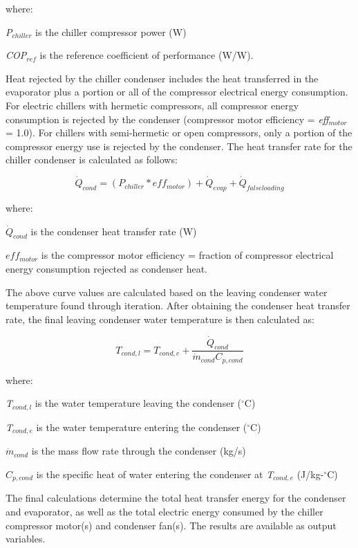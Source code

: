 where:

\emph{P\(_{chiller}\)} is the chiller compressor power (W)

\emph{COP\(_{ref}\)} is the reference coefficient of performance (W/W).

Heat rejected by the chiller condenser includes the heat transferred in the evaporator plus a portion or all of the compressor electrical energy consumption. For electric chillers with hermetic compressors, all compressor energy consumption is rejected by the condenser (compressor motor efficiency = \emph{eff\(_{motor}\)} = 1.0). For chillers with semi-hermetic or open compressors, only a portion of the compressor energy use is rejected by the condenser. The heat transfer rate for the chiller condenser is calculated as follows:

\begin{equation}
{\dot{Q}_{cond}} = \left( {{P_{chiller}} * ef{f_{motor}}} \right) + {\dot{Q}_{evap}} + {\dot{Q}_{falseloading}}
\end{equation}

where:

\({\dot{Q}_{cond}}\) is the condenser heat transfer rate (W)

\(ef{f_{motor}}\) is the compressor motor efficiency = fraction of compressor electrical energy consumption rejected as condenser heat.

The above curve values are calculated based on the leaving condenser water temperature found through iteration. After obtaining the condenser heat transfer rate, the final leaving condenser water temperature is then calculated as:

\begin{equation}
  T_{cond,l} = T_{cond,e} + \frac{\dot{Q}_{cond}}{\dot{m}_{cond} C_{p,cond}}
\end{equation}

where:

\emph{T\(_{cond,l}\)} is the water temperature leaving the condenser (\(^{\circ}\)C)

\emph{T\(_{cond,e}\)} is the water temperature entering the condenser (\(^{\circ}\)C)

\({\dot{m}_{cond}}\) is the mass flow rate through the condenser (kg/s)

\({C_{p,cond}}\) is the specific heat of water entering the condenser at \emph{T\(_{cond,e}\)} (J/kg-\(^{\circ}\)C)

The final calculations determine the total heat transfer energy for the condenser and evaporator, as well as the total electric energy consumed by the chiller compressor motor(s) and condenser fan(s). The results are available as output variables.

